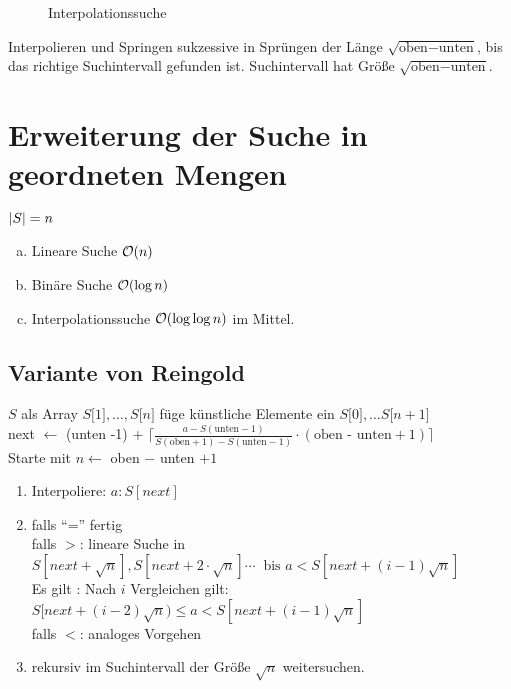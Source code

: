         \begin{figure}
            \centering
            
            \caption{Interpolationssuche}
            \label{diag2:interpolationsearch}
        \end{figure}
        
        Interpolieren und Springen sukzessive in Sprüngen der Länge $\sqrt{\text{oben} - \text{unten}}$, bis das richtige Suchintervall gefunden ist.
        Suchintervall hat Größe $\sqrt{\text{oben} - \text{unten}}$.

    
    \section{Erweiterung der Suche in geordneten Mengen}
        $\left| S \right| = n$ \\
        \begin{enumerate}[a.)]
            \item Lineare Suche $\mathcal{O}(n)$ 
            \item Binäre Suche $\mathcal{O}(\log n)$
            \item Interpolationssuche $\mathcal{O}(\log \log n)$ im Mittel.
        \end{enumerate}
      
        \subsection{Variante von Reingold}
            $S$ als Array $S\lbrack 1 \rbrack, \ldots, S \lbrack
            n \rbrack$ füge künstliche Elemente ein $S \lbrack 0 \rbrack, \ldots S
            \lbrack n+1 \rbrack$ \\
            next $\leftarrow$ (unten -1) + $\lceil \frac{a-S(\text{unten}
            -1)}{S(\text{oben} +1) - S (\text{unten}-1)} \cdot (\text{oben - unten} + 1) \rceil$ \\
            Starte mit $n \leftarrow$ oben $-$ unten $+1$\\
            \begin{enumerate}[(1)]
                \item
                Interpoliere: $a : S[next]$ 
                \item 
                falls ``='' fertig \\
                falls $>$: lineare Suche in $S[next+\sqrt{n}], S[next+2 \cdot \sqrt{n}] \cdots \ \text{ bis } a < S[next+(i-1)\sqrt{n}]$ \\
                Es gilt : Nach $i$ Vergleichen gilt: $S[next+(i-2)\sqrt{n}) \leq a < S[next+(i-1)\sqrt{n}]$ \\
                falls $<$: analoges Vorgehen
                \item
                rekursiv im Suchintervall der Größe $\sqrt{n}$ weitersuchen. \\
            \end{enumerate}
        

